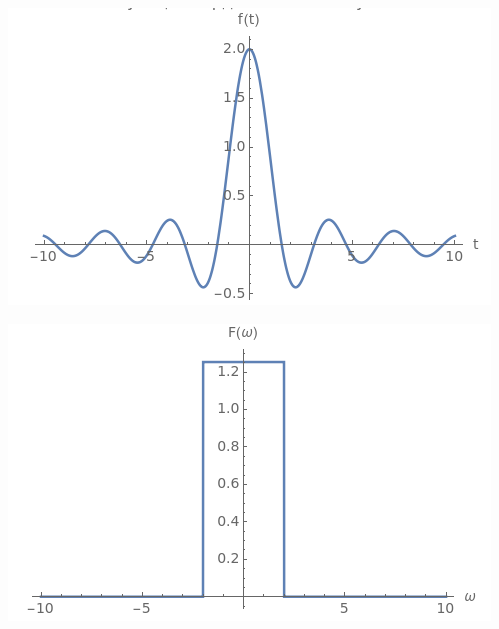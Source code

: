 \documentclass[a4paper,12pt]{article}
\begin{document}
\begin{center}
\begin{minipage}{0.48\textwidth}
  \centering
  \includegraphics[width=\linewidth]{images/3f22.png}
\end{minipage}
\hfill
\begin{minipage}{0.48\textwidth}
  \centering
  \includegraphics[width=\linewidth]{images/3F22.png}
\end{minipage}
\end{center}
\end{document}
